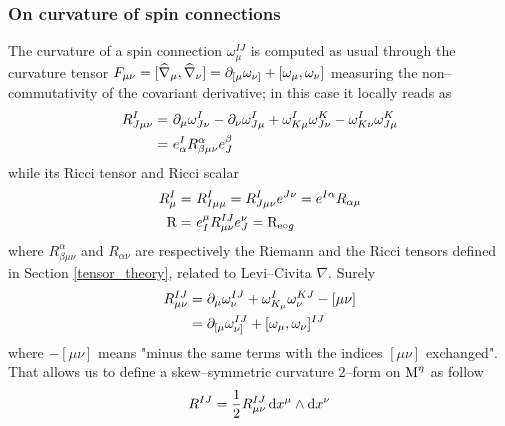 \subsubsection{On curvature of spin connections}
The curvature of a spin connection $\omega^{IJ}_\mu$ is computed as usual through the curvature tensor $F_{\mu\nu}=[\widehat{\nabla}_\mu,\widehat{\nabla}_\nu]=\partial_{[\mu}\omega_{\nu]}+[\omega_\mu,\omega_\nu]$ measuring the non--commutativity of the covariant derivative; in this case it locally reads as
\begin{align*}
R^I_{J\mu\nu}=&\,\,\partial_\mu\omega^I_{J\nu}-\partial_\nu\omega^I_{J\mu}+\omega^I_{K\mu}\omega_{J\nu}^K-\omega_{K\nu}^I\omega_{J\mu}^K\\
    =&\,\,e^I_\alpha R^\alpha_{\beta\mu\nu}e^\beta_J
    \end{align*}
while its Ricci tensor and Ricci scalar 
    \begin{align*}
    R^I_\mu=&\,\,R^I_{I\mu\mu}=R^I_{J\mu\nu}e^{J\nu}=e^{I\alpha}R_{\alpha\mu}\\
    \text{\normalfont R}=&\,\,e^\mu_I R^{IJ}_{\mu\nu}e^\nu_J=\text{\normalfont R}_{\text{\normalfont e}\circ g}
    \end{align*}
where $R^\alpha_{\beta\mu\nu}$ and $R_{\alpha\nu}$ are respectively the Riemann and the Ricci tensors defined in Section \ref{tensor_theory}, related to Levi--Civita $\nabla$. Surely
\begin{equation}\label{spin_curv}
\begin{split}
    R^{IJ}_{\mu\nu}&=\partial_\mu\omega_\nu^{IJ}+\omega^I_{K_\mu}\omega^{KJ}_\nu-[\mu\nu]\\
    &=\partial_{[\mu}\omega_{\nu]}^{IJ}+[\omega_\mu,\omega_\nu]^{IJ}  
\end{split}
\end{equation}
where $- [\mu\nu]$ means "minus the same terms with the indices $[\mu\nu]$ exchanged". That allows us to define a skew--symmetric curvature 2--form on $\text{\normalfont M}^\eta$ as follow
$$R^{IJ}=\frac{1}{2}R^{IJ}_{\mu\nu}\,\text{\normalfont d} x^\mu\wedge\text{\normalfont d} x^\nu$$





